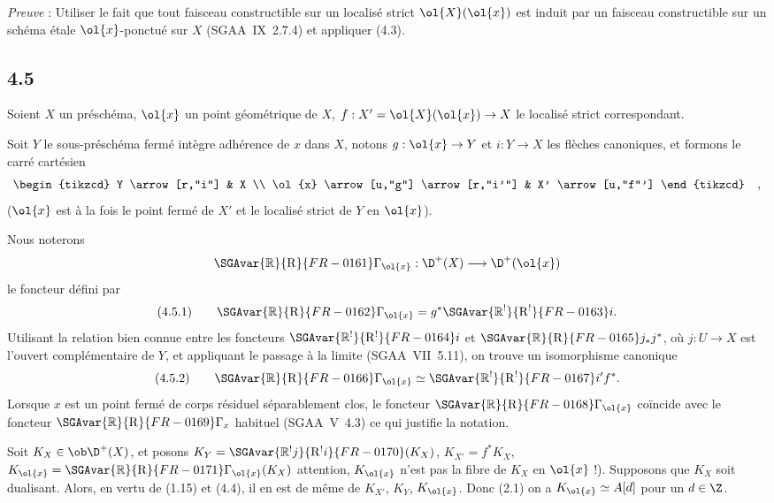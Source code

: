 \emph{Preuve} : Utiliser le fait que tout faisceau constructible sur un localisé strict $\ol{X}(\ol{x})$ est induit par un faisceau constructible sur un schéma étale $\ol{x}$-ponctué sur $X$ (SGAA~IX~2.7.4) et appliquer (4.3).

\subsection*{4.5}
Soient $X$ un préschéma, $\ol{x}$ un point géométrique de $X$, $f:X'=\ol{X}(\ol{x})\to X$ le localisé strict correspondant.

Soit $Y$ le sous-préschéma fermé intègre adhérence de $x$ dans $X$, notons $g:\ol{x}\to Y$ et $i:Y\to X$ les flèches canoniques, et formons le carré cartésien
\[
\begin{tikzcd}
Y \arrow[r,"i"] & X \\
\ol{x} \arrow[u,"g"] \arrow[r,"i'"] & X' \arrow[u,"f"']
\end{tikzcd}\quad ,
\]
($\ol{x}$ est à la fois le point fermé de $X'$ et le localisé strict de $Y$ en $\ol{x}$).

Nous noterons
\[
\SGAvar{\mathbb{R}}{\mathrm{R}}{FR-0161}\Gamma_{\ol{x}}:\D^+(X)\longrightarrow \D^+(\ol{x})
\]
le foncteur défini par
\[
(4.5.1)\qquad \SGAvar{\mathbb{R}}{\mathrm{R}}{FR-0162}\Gamma_{\ol{x}}=g^*\SGAvar{\mathbb{R}^{!}}{\mathrm{R}^{!}}{FR-0163}i.
\]
Utilisant la relation bien connue entre les foncteurs $\SGAvar{\mathbb{R}^{!}}{\mathrm{R}^{!}}{FR-0164}i$ et $\SGAvar{\mathbb{R}}{\mathrm{R}}{FR-0165} j_*j^*$, où $j:U\to X$ est l'ouvert complémentaire de $Y$, et appliquant le passage à la limite (SGAA~VII~5.11), on trouve un isomorphisme canonique
\[
(4.5.2)\qquad \SGAvar{\mathbb{R}}{\mathrm{R}}{FR-0166}\Gamma_{\ol{x}}\simeq\SGAvar{\mathbb{R}^{!}}{\mathrm{R}^{!}}{FR-0167}i' f^*.
\]
Lorsque $x$ est un point fermé de corps résiduel séparablement clos, le foncteur $\SGAvar{\mathbb{R}}{\mathrm{R}}{FR-0168}\Gamma_{\ol{x}}$ coïncide avec le foncteur $\SGAvar{\mathbb{R}}{\mathrm{R}}{FR-0169}\Gamma_x$ habituel (SGAA~V~4.3) ce qui justifie la notation.

Soit $K_X\in\ob\D^+(X)$, et posons $K_Y=\SGAvar{\mathbb{R}^{!}j}{\mathrm{R}^{!}i}{FR-0170}(K_X)$, $K_{X'}=f^*K_X$, $K_{\ol{x}}=\SGAvar{\mathbb{R}}{\mathrm{R}}{FR-0171}\Gamma_{\ol{x}}(K_X)$ attention, $K_{\ol{x}}$ n'est pas la fibre de $K_X$ en $\ol{x}$ !). Supposons que $K_X$ soit dualisant. Alors, en vertu de (1.15) et (4.4), il en est de même de $K_{X'}$, $K_Y$, $K_{\ol{x}}$. Donc (2.1) on a $K_{\ol{x}}\simeq A[d]$ pour un $d\in\Z$.

